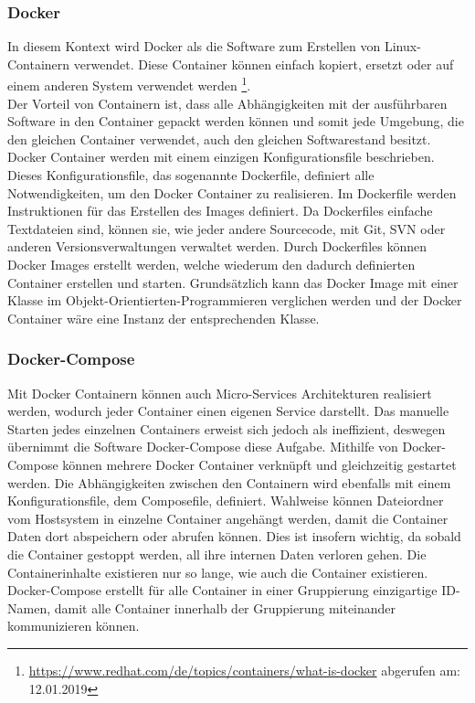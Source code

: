 \subsubsection{Docker}
In diesem Kontext wird Docker als die Software zum Erstellen von Linux-Containern verwendet.
Diese Container können einfach kopiert, ersetzt oder auf einem anderen System verwendet werden \footnote{\url{https://www.redhat.com/de/topics/containers/what-is-docker} abgerufen am: 12.01.2019}.\\
Der Vorteil von Containern ist, dass alle Abhängigkeiten mit der ausführbaren Software in den Container gepackt werden können und somit jede Umgebung, die den gleichen Container verwendet, auch den gleichen Softwarestand besitzt.
Docker Container werden mit einem einzigen Konfigurationsfile beschrieben.
Dieses Konfigurationsfile, das sogenannte Dockerfile, definiert alle Notwendigkeiten, um den Docker Container zu realisieren.
Im Dockerfile werden Instruktionen für das Erstellen des Images definiert.
Da Dockerfiles einfache Textdateien sind, können sie, wie jeder andere Sourcecode, mit Git, SVN oder anderen Versionsverwaltungen verwaltet werden.
Durch Dockerfiles können Docker Images erstellt werden, welche wiederum den dadurch definierten Container erstellen und starten.
Grundsätzlich kann das Docker Image mit einer Klasse im Objekt-Orientierten-Programmieren verglichen werden und der Docker Container wäre eine Instanz der entsprechenden Klasse. 
\subsubsection{Docker-Compose}
Mit Docker Containern können auch Micro-Services Architekturen realisiert werden, wodurch jeder Container einen eigenen Service darstellt.
Das manuelle Starten jedes einzelnen Containers erweist sich jedoch als ineffizient, deswegen übernimmt die Software \glqq Docker-Compose\grqq{} diese Aufgabe.
Mithilfe von Docker-Compose können mehrere Docker Container verknüpft und gleichzeitig gestartet werden.
Die Abhängigkeiten zwischen den Containern wird ebenfalls mit einem Konfigurationsfile, dem Composefile, definiert.
Wahlweise können Dateiordner vom Hostsystem in einzelne Container angehängt werden, damit die Container Daten dort abspeichern oder abrufen können.
Dies ist insofern wichtig, da sobald die Container gestoppt werden, all ihre internen Daten verloren gehen.
Die Containerinhalte existieren nur so lange, wie auch die Container existieren.
Docker-Compose erstellt für alle Container in einer Gruppierung einzigartige ID-Namen, damit alle Container innerhalb der Gruppierung miteinander kommunizieren können.
